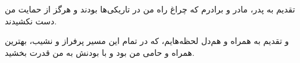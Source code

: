 \begin{acknowledgementpage}

\vspace{1.5cm}

{\nastaliq
{
\begin{center}
تقدیم به پدر، مادر و برادرم که چراغ راه من در تاریکی‌ها بودند و هرگز از حمایت من دست نکشیدند.

و تقدیم به همراه و هم‌دل لحظه‌هایم، که در تمام این مسیر پرفراز و نشیب، بهترین همراه و حامی من بود و با بودنش به من قدرت بخشید.
\end{center}
}}\end{acknowledgementpage}
\newpage